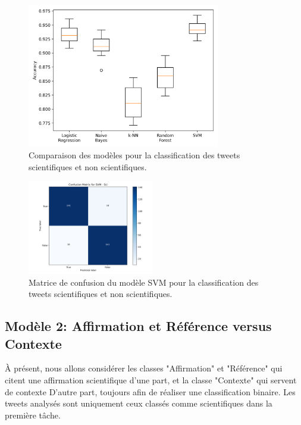 \begin{figure}[H]
    \centering
    \includegraphics[width=0.75\textwidth]{images/model_comparison_1}
    \caption{Comparaison des modèles pour la classification des tweets scientifiques et non scientifiques.}
    \label{fig:model_comparison_sci_nsci}
\end{figure}

\begin{figure}[H]
    \centering
    \includegraphics[width=0.49\textwidth]{images/confusion_1.json-SVM_Sci_confusion_matrix}
    \caption{Matrice de confusion du modèle SVM pour la classification des tweets scientifiques et non scientifiques.}
    \label{fig:confusion_1.json-SVM_sci_confusion_matrix}
\end{figure}

\subsection{Modèle 2: Affirmation et Référence versus Contexte}\label{subsec:modele-2:-claim-et-ref-vs-contexte}
À présent, nous allons considérer les classes "Affirmation" et "Référence" qui citent une affirmation scientifique d’une part, et la classe "Contexte" qui servent de contexte
D’autre part, toujours afin de réaliser une classification binaire.
Les tweets analysés sont uniquement ceux classés comme scientifiques dans la première tâche.

